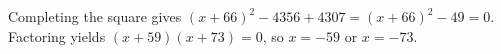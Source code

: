 Completing the square gives $(x+66)^2-4356+4307=(x+66)^2-49=0$. Factoring yields $(x+59)(x+73)=0$, so $\boxed{x=-59\text{ or }x=-73}$.
